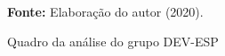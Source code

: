 \begin{figure}[ht!]
\centering

\caption{\textmd{Quadro da análise do grupo DEV-ESP}}
\label{fig:quadro:grupodevesp}

\par\medskip\textbf{Fonte:} Elaboração do autor (2020). \par\medskip

\end{figure}

